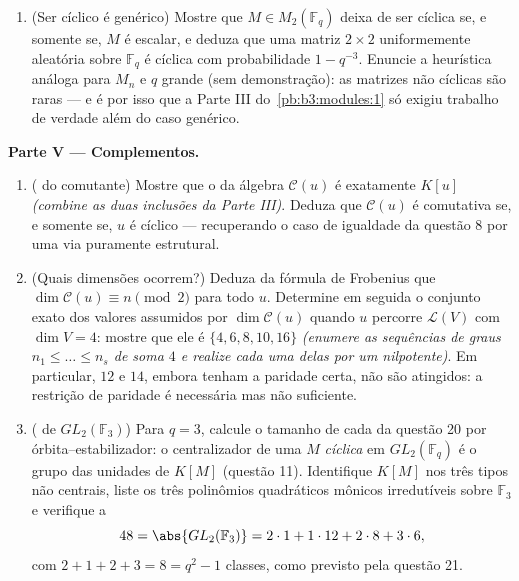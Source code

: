 \begin{problem}
\begin{enumerate}[resume]
        $q^2 - 1$ . \emph{(Conte os polinômios
        quadráticos mônicos irredutíveis sobre $\mathbb F_q$; os pares não
        ordenados $\{a, b\}$; lembre-se de que a inversibilidade restringe
        os termos constantes.)}
  \item (Ser cíclico é genérico) Mostre que $M \in M_2(\mathbb F_q)$ deixa de ser cíclica
        se, e somente se, $M$ é escalar, e deduza que uma matriz
        $2\times2$ uniformemente aleatória sobre $\mathbb F_q$ é cíclica com
        probabilidade $1 - q^{-3}$. Enuncie a heurística análoga para $M_n$
        e $q$ grande (sem demonstração): as matrizes não cíclicas
        são raras --- e é por isso que a Parte III do~\cref{pb:b3:modules:1} só
        exigiu trabalho de verdade além do caso genérico.
\end{enumerate}

\medskip
\noindent\textbf{Parte V --- Complementos.}
\begin{enumerate}[resume]
  \item ( do comutante) Mostre que o  da álgebra $\mathcal C(u)$ é
        exatamente $K[u]$ \emph{(combine as duas inclusões da Parte
        III)}. Deduza que $\mathcal C(u)$ é comutativa se, e somente se, $u$
        é cíclico --- recuperando o caso de igualdade da questão 8 por
        uma via puramente estrutural.
  \item (Quais dimensões ocorrem?) Deduza da fórmula de Frobenius que
        $\dim\mathcal C(u) \equiv n \pmod 2$ para todo $u$. Determine em seguida o conjunto exato
        dos valores assumidos por $\dim \mathcal C(u)$ quando $u$ percorre $\mathcal L(V)$
        com $\dim V = 4$: mostre que ele é $\{4, 6,
        8, 10, 16\}$ \emph{(enumere as sequências
        de graus $n_1
        \leq \dots \leq n_s$ de soma $4$ e realize cada uma delas por um
        nilpotente)}. Em particular, $12$ e $14$, embora tenham
        a paridade certa, não são atingidos: a restrição de paridade é
        necessária mas não suficiente.
  \item ( de $GL_2(\mathbb F_3)$) Para $q = 3$, calcule o
        tamanho de cada  da questão 20 por
        órbita--estabilizador: o centralizador de uma $M$
        \emph{cíclica} em $GL_2(\mathbb F_q)$ é o grupo das unidades de $K[M]$
        (questão 11). Identifique $K[M]$ nos três tipos não
        centrais, liste os três polinômios quadráticos mônicos
        irredutíveis sobre $\mathbb F_3$ e verifique a 
        \[
        48 = \abs{GL_2(\mathbb F_3)}
        = 2\cdot1 + 1\cdot12 + 2\cdot8 + 3\cdot6,
        \]
        com $2 + 1 + 2 + 3 = 8 = q^2 - 1$ classes, como previsto pela questão 21.
\end{enumerate}
\end{problem}
